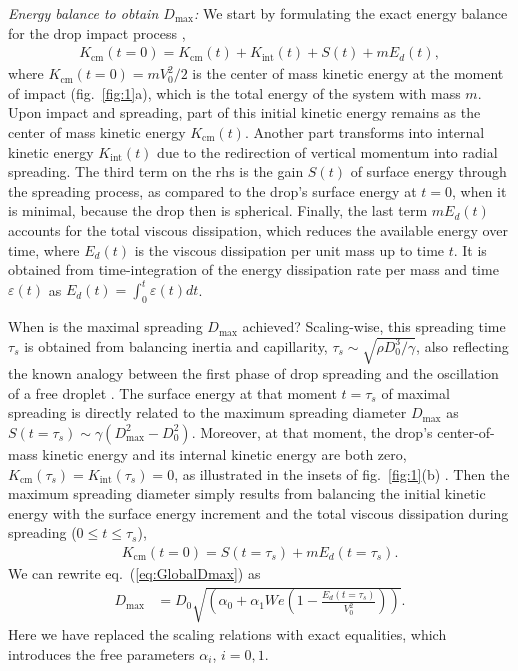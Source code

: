 \documentclass[preprint,amssymb,superscriptaddress,aps,prl,floatfix]{revtex4-1}
\begin{document}
{\it Energy balance  to obtain $D_\text{max}$:} We start by formulating the exact energy balance for the drop impact process \cite{Wildeman2016, sanjay_chantelot_lohse_2023},
\begin{align}
	\label{eq:energy}
	K_{\text{cm}}(t = 0) = K_{\text{cm}}(t) +  K_{\text{int}}(t) +  S(t) + mE_d(t),
\end{align}
 where $K_{\text{cm}}(t = 0) = mV_0^2/2$ is the center of mass kinetic energy at the moment of impact (fig.~\ref{fig:1}a), which is the total energy of the system with mass $m$. Upon impact and spreading, part of this initial kinetic energy remains as the center of mass kinetic energy $K_{\text{cm}}(t)$.
 Another part transforms into internal kinetic energy $K_{\text{int}}(t)$
 due to the redirection of vertical momentum into radial spreading. 
 The third term on the rhs is the gain $S(t)$ of surface energy through the 
 spreading process, 
 as compared to the drop's  surface energy at $t=0$, when it is minimal, because 
 the drop then is spherical. Finally, the last term $mE_d(t)$
 accounts for the total 
 viscous dissipation, which reduces the available energy over time, 
 where $E_d(t)$ is the viscous dissipation per unit mass up to time $t$. 
 It is obtained from  time-integration of the energy dissipation rate 
 per mass and time $\varepsilon (t)$ as $E_d(t) = \int_0^t \varepsilon (t) dt$.

 When is the maximal spreading $D_\text{max}$ achieved? 
 Scaling-wise, this spreading time 
$\tau_s$ is obtained from balancing inertia and capillarity, 
$\tau_s \sim  \sqrt{\rho D_0^3/\gamma}$, also reflecting the known 
 analogy between the first phase of drop spreading and the 
 oscillation of a free droplet
 \cite{Richard2002, Jha2020, sanjay_lohse_jalaal_2021}. 
The surface energy at that moment  $t=\tau_s$ of maximal spreading is directly related to the maximum spreading diameter $D_{\text{max}}$ as $S(t = \tau_s) \sim \gamma\left(D_{\text{max}}^2 - D_0^2\right)$. Moreover, 
at that moment,  
the drop's center-of-mass  kinetic energy and its 
internal kinetic energy are both zero, 
$ K_{\text{cm}} (\tau_s ) =  K_{\text{int}} (\tau_s ) = 0$,  as illustrated in the insets of fig.~\ref{fig:1}(b) \cite{afkhami2013numerical, sanjay_lohse_jalaal_2021}. 
Then the maximum spreading diameter 
simply results from balancing the initial kinetic energy with the surface energy increment and the total viscous dissipation during spreading ($0 \le  t \le  \tau_s$), 
\begin{align}
	\label{eq:GlobalDmax}
	K_{\text{cm}}(t = 0) = S(t = \tau_s) + mE_d(t = \tau_s).
\end{align}
We can rewrite eq.\ (\ref{eq:GlobalDmax}) as 
\begin{align}
\label{eq:GlobalDmax_v2}
	D_{\text{max}} &= D_0\sqrt{\left(\alpha_0 + \alpha_1We\left(1 - \frac{E_d(t = \tau_s)}{V_0^2}\right)\right)}. 
 \end{align}
 Here we have replaced the scaling relations with exact equalities, which  introduces the free parameters 
 $\alpha_i$,  $i=0, 1$. 
\end{document}
